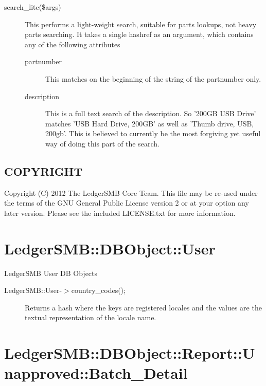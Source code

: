\begin{description}
\begin{description}
\begin{description}
\begin{description}
\begin{description}
\begin{description}
\begin{description}
\begin{description}
\begin{description}
\begin{description}
\begin{description}
\item[{search\_lite(\$args)}] \mbox{}

This performs a light-weight search, suitable for parts lookups, not heavy parts
searching.  It takes a single hashref as an argument, which contains any of the
following attributes

\begin{description}

\item[{partnumber}] \mbox{}

This matches on the beginning of the string of the partnumber only.


\item[{description}] \mbox{}

This is a full text search of the description.  So '200GB USB Drive' matches
'USB Hard Drive, 200GB' as well as 'Thumb drive, USB, 200gb'.  This is believed
to currently be the most forgiving yet useful way of doing this part of the
search.

\end{description}
\end{description}
\subsection*{COPYRIGHT\label{LedgerSMB::DBObject::Part_COPYRIGHT}}


Copyright (C) 2012 The LedgerSMB Core Team.  This file may be re-used under the
terms of the GNU General Public License version 2 or at your option any later
version.  Please see the included LICENSE.txt for more information.

\section{LedgerSMB::DBObject::User\label{LedgerSMB::DBObject::User}}


LedgerSMB User DB Objects

\begin{description}

\item[{LedgerSMB::User-$>$country\_codes();}] \mbox{}

Returns a hash where the keys are registered locales and the values are the
textual representation of the locale name.

\end{description}
\section{LedgerSMB::DBObject::Report::Unapproved::Batch\_Detail\label{LedgerSMB::DBObject::Report::Unapproved::Batch_Detail}}



\end{description}
\end{description}
\end{description}
\end{description}
\end{description}
\end{description}
\end{description}
\end{description}
\end{description}
\end{description}
